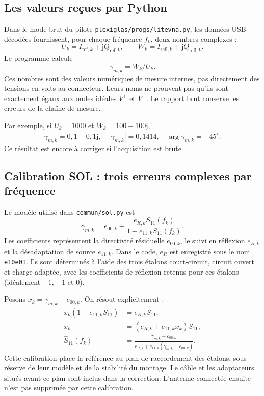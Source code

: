 \documentclass[11pt,a4paper]{article}
\newcommand{\jj}{\mathrm{j}}
\begin{document}
\subsection{Les valeurs reçues par Python}
Dans le mode brut du pilote \texttt{plexiglas/progs/litevna.py}, les données
USB décodées fournissent, pour chaque fréquence $f_k$, deux nombres complexes :
\begin{equation}
 U_k=I_{\mathrm{ref},k}+\jj Q_{\mathrm{ref},k},\qquad
 W_k=I_{\mathrm{refl},k}+\jj Q_{\mathrm{refl},k}.
\end{equation}
Le programme calcule
\begin{equation}
 \boxed{\gamma_{m,k}=W_k/U_k.}
\end{equation}
Ces nombres sont des valeurs numériques de mesure internes, pas directement
des tensions en volts au connecteur. Leurs noms ne prouvent pas qu'ils sont
exactement égaux aux ondes idéales $V^+$ et $V^-$. Le rapport brut conserve
les erreurs de la chaîne de mesure.

Par exemple, si $U_k=1000$ et $W_k=100-100\jj$,
\begin{equation}
 \gamma_{m,k}=0{,}1-0{,}1\jj,
 \quad |\gamma_{m,k}|=0{,}1414,
 \quad \arg\gamma_{m,k}=-45^\circ.
\end{equation}
Ce résultat est encore à corriger si l'acquisition est brute.

\subsection{Calibration SOL : trois erreurs complexes par fréquence}
Le modèle utilisé dans \texttt{commun/sol.py} est
\begin{equation}
 \gamma_{m,k}=e_{00,k}+
 \frac{e_{R,k}S_{11}(f_k)}{1-e_{11,k}S_{11}(f_k)}.
\end{equation}
Les coefficients représentent la directivité résiduelle $e_{00,k}$,
le suivi en réflexion $e_{R,k}$ et la désadaptation de source $e_{11,k}$.
Dans le code, $e_R$ est enregistré sous le nom \texttt{e10e01}.
Ils sont déterminés à l'aide des trois étalons court-circuit, circuit
ouvert et charge adaptée, avec les coefficients de réflexion retenus
pour ces étalons (idéalement $-1$, $+1$ et $0$).

Posons $x_k=\gamma_{m,k}-e_{00,k}$. On résout explicitement :
\begin{align}
 x_k(1-e_{11,k}S_{11})&=e_{R,k}S_{11},\\
 x_k&=(e_{R,k}+e_{11,k}x_k)S_{11},\\
 \widehat S_{11}(f_k)
 &=\frac{\gamma_{m,k}-e_{00,k}}
 {e_{R,k}+e_{11,k}(\gamma_{m,k}-e_{00,k})}.
\end{align}
Cette calibration place la référence au plan de raccordement des étalons,
sous réserve de leur modèle et de la stabilité du montage. Le câble et
les adaptateurs situés avant ce plan sont inclus dans la correction.
L'antenne connectée ensuite n'est pas supprimée par cette calibration.
\end{document}
